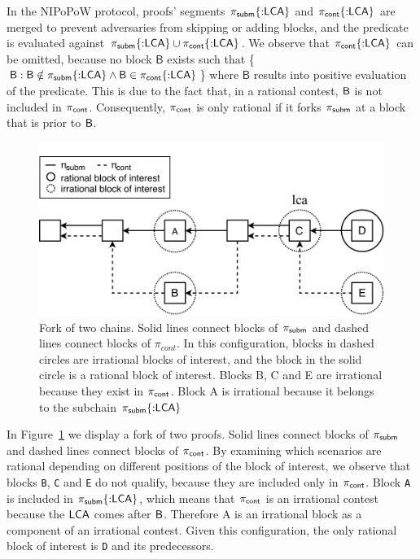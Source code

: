 \newcommand{\block}{\mathsf{B}}

In the NIPoPoW protocol, proofs' segments $\mathsf{\pi_{subm}}\{{{:}}\mathsf{LCA}\}$ and
$\mathsf{\pi_{cont}}\{{:}\mathsf{LCA}\}$ are merged to prevent adversaries from skipping or adding
blocks, and the predicate is evaluated against $\mathsf{\pi_{subm}}\{{:}\mathsf{LCA}\} \cup
\mathsf{\pi_{cont}}\{{:}\mathsf{LCA}\}$. We observe that $\mathsf{\pi_{cont}}\{{:}\mathsf{LCA}\}$ can be omitted, because no
block $\block$ exists such that \{$\block : \block \notin \pis\{{:}\lca\} \land
\block \in \pic\{{:}\lca\}$\} where $\block$ results into positive evaluation
of the predicate. This is due to the fact that, in a rational contest, $\mathsf{B}$
is not included in $\mathsf{\pi_{cont}}$. Consequently, $\mathsf{\pi_{cont}}$ is only rational if it forks
$\mathsf{\pi_{subm}}$ at a block that is prior to $\mathsf{B}$.

\renewcommand{\block}{}

\begin{figure}[h]
    \begin{center}
        \includegraphics[width=1\columnwidth]{figures/boi-position.pdf}
    \end{center}
    \caption{Fork of two chains. Solid lines connect blocks of $\mathsf{\pi_{subm}}$
    and dashed lines connect blocks of $\pi_{cont}$. In this configuration,
    blocks in dashed circles are irrational blocks of interest, and the block
    in the solid circle is a rational block of interest. Blocks B, C and E are
    irrational because they exist in $\mathsf{\pi_{cont}}$. Block A is irrational because it
    belongs to the subchain $\mathsf{\pi_{subm}}\{{:}\mathsf{LCA}\}$}
    \label{fig:boi-position}
\end{figure}

In Figure~\ref{fig:boi-position} we display a fork of two proofs. Solid lines
connect blocks of $\mathsf{\pi_{subm}}$ and dashed lines connect blocks of $\mathsf{\pi_{cont}}$. By
examining which scenarios are rational depending on different positions of the
block of interest, we observe that blocks \texttt{B}, \texttt{C} and \texttt{E}
do not qualify, because they are included only in $\mathsf{\pi_{cont}}$. Block \texttt{A} is
included in $\mathsf{\pi_{subm}}\{{:}\mathsf{LCA}\}$, which means that $\mathsf{\pi_{cont}}$ is an irrational contest
because the $\mathsf{LCA}$ comes after $\mathsf{B}$. Therefore A is an irrational block as a
component of an irrational contest. Given this configuration, the only rational
block of interest is \texttt{D} and its predecessors.

